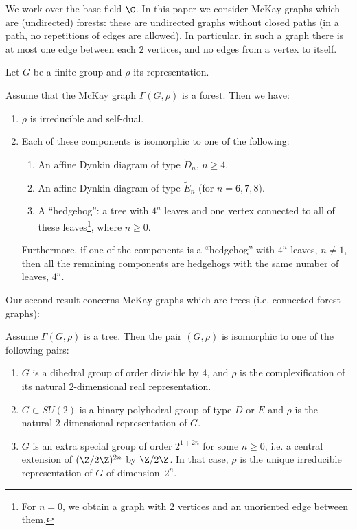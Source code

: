 We work over the base field $\C$. In this paper we consider McKay graphs which are \textup{(}undirected\textup{)} forests: these are undirected graphs without closed paths \textup{(}in a path, no repetitions of edges are allowed\textup{)}. In particular, in such a graph there is at most one edge between each $2$ vertices, and no edges from a vertex to itself.
\begin{introtheorem}\label{introthm:forests}
Let $G$ be a finite group and $\rho$ its representation.

Assume that the McKay graph $\Gamma(G,\rho)$ is a forest. Then we have: 
    \begin{enumerate}
        \item $\rho$ is irreducible and self-dual.
        \item Each of these components  is isomorphic to one of the following:
\begin{enumerate}
    \item An affine Dynkin diagram of type $\tilde{D}_{n}$, $n\geq 4$.
\item An affine Dynkin diagram of type $\tilde{E}_n$ \textup{(}for $n=6,7,8$\textup{)}.
\item  A ``hedgehog'': a tree with $4^n$ leaves and one vertex connected to all of these leaves\footnote{For $n=0$, we obtain a graph with $2$ vertices and an unoriented edge between them.}, where $n\geq 0$.
\end{enumerate}
Furthermore, if one of the components is a ``hedgehog'' with $4^n$ leaves, $n\neq 1$, then all the remaining components are hedgehogs with the same number of leaves, $4^n$.
\end{enumerate}
\end{introtheorem}
Our second result concerns McKay graphs which are trees (i.e. connected forest graphs):
\begin{introtheorem}\label{introthm:trees}
Assume $\Gamma(G,\rho)$ is a tree. Then the pair $(G,\rho)$ is isomorphic to one of the following pairs: 
\begin{enumerate}
    \item $G$ is a dihedral group of order divisible by $4$, and $\rho$ is the complexification of its natural $2$-dimensional real representation.
    
\item $G \subset SU(2)$ is a binary polyhedral group of type $D$ or $E$ and $\rho$ is the natural $2$-dimensional representation of $G$.

\item $G$ is an extra special group of order $2^{1+2n}$ for some $n\geq 0$, i.e. a central extension of $(\Z/2\Z)^{2n}$ by $\Z/2\Z$. In that case, $\rho$ is the unique irreducible representation of $G$ of dimension~$2^n$.
\end{enumerate} 
\end{introtheorem}



